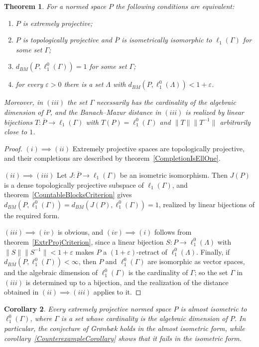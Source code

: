 \documentclass[12pt]{article}
\newtheorem{theorem}{Theorem}[section]
\newtheorem{corollary}[theorem]{Corollary}
\newcommand{\lo}[1]{\ell_1^0(#1)}
\newcommand{\ellone}[1]{\ell_1(#1)}
\newcommand{\norm}[1]{\lVert #1\rVert}
\newcommand{\BM}{d_{BM}}
\begin{document}
\begin{theorem}\label{FinalCharacterization} For a normed space $P$ the
    following conditions are equivalent:
    \begin{enumerate}[label = (\roman*)]
        \item $P$ is extremely projective;
        \item $P$ is topologically projective and $\overline{P}$ is
              isometrically isomorphic to $\ellone{\Gamma}$ for some set
              $\Gamma$;
        \item $\BM(P,\lo{\Gamma})=1$ for some set $\Gamma$;
        \item for every $\varepsilon>0$ there is a set $\Lambda$ with
              $\BM(P,\lo{\Lambda})<1+\varepsilon$.
    \end{enumerate}
    Moreover, in $(iii)$ the set $\Gamma$ necessarily has the cardinality of
    the algebraic dimension of $P$, and the Banach--Mazur distance in
    $(iii)$ is realized by linear bijections
    $T:\overline{P}\to\ellone{\Gamma}$ with $T(P)=\lo{\Gamma}$ and
    $\norm{T}\norm{T^{-1}}$ arbitrarily close to $1$.
\end{theorem}
\begin{proof} $(i)\implies(ii)$ Extremely projective spaces are
    topologically projective, and their completions are described by
    theorem~\ref{CompletionIsEllOne}.

    $(ii)\implies(iii)$ Let $J:\overline{P}\to\ellone{\Gamma}$ be an isometric
    isomorphism. Then $J(P)$ is a dense topologically projective subspace of
    $\ellone{\Gamma}$, and theorem~\ref{CountableBlocksCriterion} gives
    $\BM(P,\lo{\Gamma})=\BM(J(P),\lo{\Gamma})=1$, realized by linear
    bijections of the required form.

    $(iii)\implies(iv)$ is obvious, and $(iv)\implies(i)$ follows from
    theorem~\ref{ExtrProjCriterion}, since a linear bijection $S:P\to\lo{\Lambda}$
    with $\norm{S}\norm{S^{-1}}<1+\varepsilon$ makes $P$ a
    $(1+\varepsilon)$-retract of $\lo{\Lambda}$. Finally, if
    $\BM(P,\lo{\Gamma})<\infty$, then $P$ and $\lo{\Gamma}$ are isomorphic as
    vector spaces, and the algebraic dimension of $\lo{\Gamma}$ is the
    cardinality of $\Gamma$; so the set $\Gamma$ in $(iii)$ is determined up
    to a bijection, and the realization of the distance obtained in
    $(ii)\implies(iii)$ applies to it.
\end{proof}

\begin{corollary}\label{GronbaekConjecture} Every extremely projective
    normed space $P$ is almost isometric to $\lo{\Gamma}$, where $\Gamma$ is a
    set whose cardinality is the algebraic dimension of $P$. In particular,
    the conjecture of Gr{\o}nb{\ae}k \cite[conjecture 3.1]{GronLiftProbNormSp}
    holds in the almost isometric form, while corollary~\ref{CounterexampleCorollary}
    shows that it fails in the isometric form.
\end{corollary}
\end{document}
